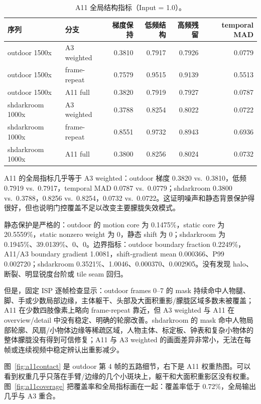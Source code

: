\documentclass[11pt,a4paper,UTF8,fontset=fandol]{ctexart}
\begin{document}
\begin{table}[H]
\centering
\small
\caption{A11 全局结构指标（Input = 1.0）。}
\label{tab:a11global}
\begin{tabular}{llrrrr}
\toprule
序列 & 分支 & 梯度保持 & 低频结构 & 高频残留 & temporal MAD \\
\midrule
outdoor 1500x & A3 weighted & 0.3810 & 0.7917 & 0.7926 & 0.0779 \\
outdoor 1500x & frame-repeat & 0.7579 & 0.9515 & 0.9139 & 0.5513 \\
outdoor 1500x & A11 full & 0.3820 & 0.7919 & 0.7927 & 0.0787 \\
shdarkroom 1000x & A3 weighted & 0.3788 & 0.8254 & 0.8022 & 0.0722 \\
shdarkroom 1000x & frame-repeat & 0.8551 & 0.9732 & 0.8943 & 0.6936 \\
shdarkroom 1000x & A11 full & 0.3800 & 0.8256 & 0.8024 & 0.0732 \\
\bottomrule
\end{tabular}
\end{table}

A11 的全局指标几乎等于 A3 weighted：outdoor 梯度 0.3820 vs.\ 0.3810，低频 0.7919 vs.\ 0.7917，temporal MAD 0.0787 vs.\ 0.0779；shdarkroom 0.3800 vs.\ 0.3788，0.8256 vs.\ 0.8254，0.0732 vs.\ 0.0722。这证明噪声和静态背景保护得很好，但也说明门控覆盖不足以改变主要朦胧失效模式。

静态保护是严格的：outdoor 的 motion core 为 0.1475\%，static core 为 20.5559\%，static nonzero weight 为 0，静态 shift 为 0；shdarkroom 为 0.1945\%、39.0139\%、0、0。边界指标：outdoor boundary fraction 0.2249\%，A11/A3 boundary gradient 1.0081，shift-gradient mean 0.000366、P99 0.002720；shdarkroom 0.3521\%、1.0046、0.000370、0.002905。没有发现 halo、断裂、明显锐度台阶或 tile seam 回归。

但是，固定 ISP 逐帧检查显示：outdoor frames 0--7 的 mask 持续命中人物腿、脚、手或少数局部边缘，主体躯干、头部及大面积重影/朦胧区域多数未被覆盖；A11 在少数四肢像素上略向 frame-repeat 靠近，但 A3 weighted 与 A11 在 overview/detail 中没有稳定、明确的轮廓改善。shdarkroom 的 mask 命中人物局部轮廓、风扇/小物体边缘等稀疏区域，人物主体、标定板、钟表和复杂小物体的整体朦胧没有得到可信修复；A11 与 A3 weighted 的画面差异非常小，无法在每帧或连续视频中稳定辨认出重影减少。

图~\ref{fig:a11contact} 是 outdoor 第 4 帧的五路细节，右下是 A11 权重热图。可以看到权重几乎只落在手臂/边缘的几个小斑块上，躯干和大面积重影区没有权重。图~\ref{fig:a11coverage} 把覆盖率和全局指标画在一起：覆盖率低于 0.72\%，全局输出几乎与 A3 重合。
\end{document}
